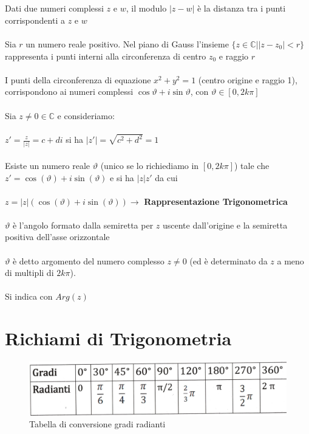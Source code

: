\documentclass{report}
\begin{document}
\\ \\
Dati due numeri complessi $z$ e $w$, il modulo $|z - w|$ è la distanza tra i punti corrispondenti a $z$ e $w$
\\ \\
Sia $r$ un numero reale positivo. Nel piano di Gauss l'insieme $\{z \in \mathbb{C} | | z - z_0 | < r\}$ rappresenta i punti interni alla circonferenza di centro $z_0$ e raggio $r$
\\ \\
I punti della circonferenza di equazione $x^2 + y^2 = 1$ (centro origine e raggio 1), corrispondono ai numeri complessi $\cos \vartheta + i \sin \vartheta$, con $\vartheta \in [0, 2k\pi]$
\\ \\
Sia $z \neq 0 \in \mathbb{C}$ e consideriamo: 
\\ \\
$z' = \frac{z}{|z|} = c + di$ si ha $|z'| = \sqrt{c^2 + d^2} = 1$
\\ \\
Esiste un numero reale $\vartheta$ (unico se lo richiediamo in $[0, 2k\pi]$) tale che $z' = \cos(\vartheta) + i\sin(\vartheta)$ e si ha $|z|z'$ da cui 
\\ \\
$z = |z|(\cos(\vartheta) + i\sin(\vartheta)) \rightarrow$ \textbf{Rappresentazione Trigonometrica}
\\ \\
$\vartheta$ è l'angolo formato dalla semiretta per $z$ uscente dall'origine e la semiretta positiva dell'asse orizzontale 
\\ \\
$\vartheta$ è detto argomento del numero complesso $z \neq 0$ (ed è determinato da $z$ a meno di multipli di $2k\pi$).
\\ \\ 
Si indica con $Arg(z)$
\section{Richiami di Trigonometria}
\begin{figure}[h]
  \centering
  \includegraphics[scale=0.8]{img/tabellaGradiRadianti.jpg}
  \caption{Tabella di conversione gradi radianti}
  \label{fig:image}
\end{figure}
\end{document}
